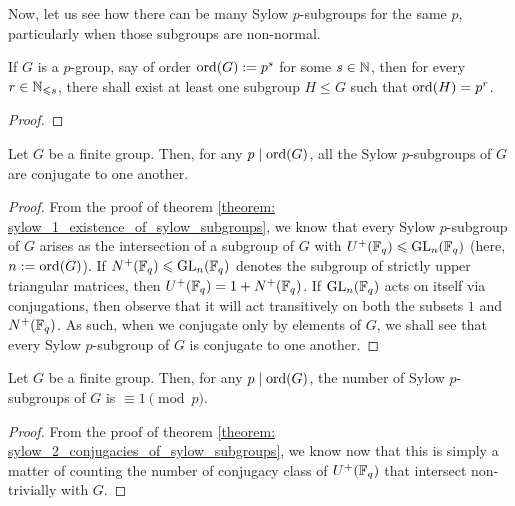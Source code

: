         Now, let us see how there can be many Sylow $p$-subgroups for the same $p$, particularly when those subgroups are non-normal.
        \begin{lemma} \label{lemma: subgroups_of_p_groups}
            If $G$ is a $p$-group, say of order $\operatorname{ord}(G) := p^s$ for some $s \in \mathbb{N}$, then for every $r \in \mathbb{N}_{\leqslant s}$, there shall exist at least one subgroup $H \leq G$ such that $\operatorname{ord}(H) = p^r$.
        \end{lemma}
            \begin{proof}
                
            \end{proof}
        \begin{theorem} \label{theorem: sylow_2_conjugacies_of_sylow_subgroups}
            Let $G$ be a finite group. Then, for any $p \mid \operatorname{ord}(G)$, all the Sylow $p$-subgroups of $G$ are conjugate to one another. 
        \end{theorem}
            \begin{proof}
                From the proof of theorem \ref{theorem: sylow_1_existence_of_sylow_subgroups}, we know that every Sylow $p$-subgroup of $G$ arises as the intersection of a subgroup of $G$ with $U^+(\mathbb{F}_q) \leqslant \mathrm{GL}_n(\mathbb{F}_q)$ (here, $n := \operatorname{ord}(G)$). If $N^+(\mathbb{F}_q) \leqslant \mathrm{GL}_n(\mathbb{F}_q)$ denotes the subgroup of strictly upper triangular matrices, then $U^+(\mathbb{F}_q) = 1 + N^+(\mathbb{F}_q)$. If $\mathrm{GL}_n(\mathbb{F}_q)$ acts on itself via conjugations, then observe that it  will act transitively on both the subsets $1$ and $N^+(\mathbb{F}_q)$. As such, when we conjugate only by elements of $G$, we shall see that every Sylow $p$-subgroup of $G$ is conjugate to one another.
            \end{proof}

        \begin{theorem} \label{theorem: sylow_3_number_of_sylow_subgroups}
            Let $G$ be a finite group. Then, for any $p \mid \operatorname{ord}(G)$, the number of Sylow $p$-subgroups of $G$ is $\equiv 1 \pmod{p}$.
        \end{theorem}
            \begin{proof}
                From the proof of theorem \ref{theorem: sylow_2_conjugacies_of_sylow_subgroups}, we know now that this is simply a matter of counting the number of conjugacy class of $U^+(\mathbb{F}_q)$ that intersect non-trivially with $G$.
            \end{proof}

